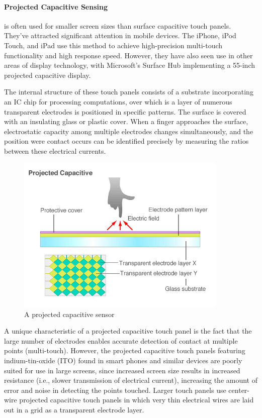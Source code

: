 \documentclass[11pt]{report}
\begin{document}
\paragraph{Projected Capacitive Sensing}

is often used for smaller screen sizes than surface capacitive touch panels. 
They've attracted significant attention in mobile devices. 
The iPhone, iPod Touch, and iPad use this method to achieve high-precision multi-touch functionality and high response speed.
However, they have also seen use in other areas of display technology, with Microsoft's Surface Hub implementing a 55-inch projected capacitive display.

The internal structure of these touch panels consists of a substrate incorporating an IC chip for processing computations, over which is a layer of numerous transparent electrodes is positioned in specific patterns. 
The surface is covered with an insulating glass or plastic cover. 
When a finger approaches the surface, electrostatic capacity among multiple electrodes changes simultaneously, and the position were contact occurs can be identified precisely by measuring the ratios between these electrical currents.

\begin{figure}
\includegraphics[width=0.9\textwidth]{projcap}
\caption{A projected capacitive sensor}
\end{figure}

A unique characteristic of a projected capacitive touch panel is the fact that the large number of electrodes enables accurate detection of contact at multiple points (multi-touch). 
However, the projected capacitive touch panels featuring indium-tin-oxide (ITO) found in smart phones and similar devices are poorly suited for use in large screens, since increased screen size results in increased resistance (i.e., slower transmission of electrical current), increasing the amount of error and noise in detecting the points touched.
Larger touch panels use center-wire projected capacitive touch panels in which very thin electrical wires are laid out in a grid as a transparent electrode layer.
 
\end{document}
